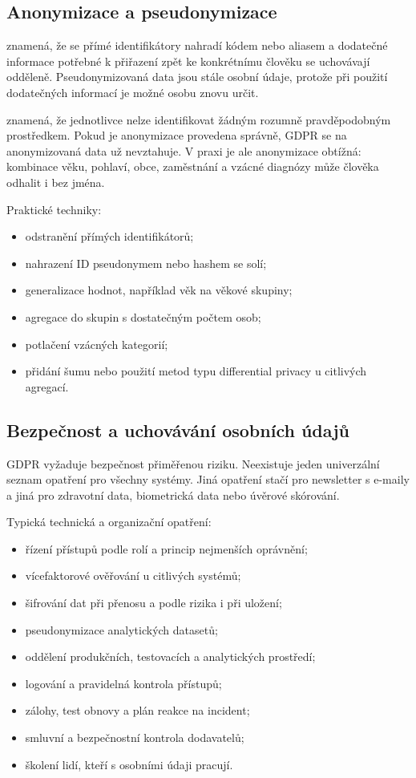 \subsection{Anonymizace a pseudonymizace}
 znamená, že se přímé identifikátory nahradí kódem nebo aliasem a dodatečné
informace potřebné k přiřazení zpět ke konkrétnímu člověku se uchovávají odděleně. Pseudonymizovaná
data jsou stále osobní údaje, protože při použití dodatečných informací je možné osobu znovu určit.

 znamená, že jednotlivce nelze identifikovat žádným rozumně pravděpodobným prostředkem.
Pokud je anonymizace provedena správně, GDPR se na anonymizovaná data už nevztahuje. V praxi je ale
anonymizace obtížná: kombinace věku, pohlaví, obce, zaměstnání a vzácné diagnózy může člověka odhalit
i bez jména.

Praktické techniky:
\begin{itemize}
  \item odstranění přímých identifikátorů;
  \item nahrazení ID pseudonymem nebo hashem se solí;
  \item generalizace hodnot, například věk na věkové skupiny;
  \item agregace do skupin s dostatečným počtem osob;
  \item potlačení vzácných kategorií;
  \item přidání šumu nebo použití metod typu differential privacy u citlivých agregací.
\end{itemize}

\subsection{Bezpečnost a uchovávání osobních údajů}
GDPR vyžaduje bezpečnost přiměřenou riziku. Neexistuje jeden univerzální seznam opatření pro všechny
systémy. Jiná opatření stačí pro newsletter s e-maily a jiná pro zdravotní data, biometrická data
nebo úvěrové skórování.

Typická technická a organizační opatření:
\begin{itemize}
  \item řízení přístupů podle rolí a princip nejmenších oprávnění;
  \item vícefaktorové ověřování u citlivých systémů;
  \item šifrování dat při přenosu a podle rizika i při uložení;
  \item pseudonymizace analytických datasetů;
  \item oddělení produkčních, testovacích a analytických prostředí;
  \item logování a pravidelná kontrola přístupů;
  \item zálohy, test obnovy a plán reakce na incident;
  \item smluvní a bezpečnostní kontrola dodavatelů;
  \item školení lidí, kteří s osobními údaji pracují.
\end{itemize}

